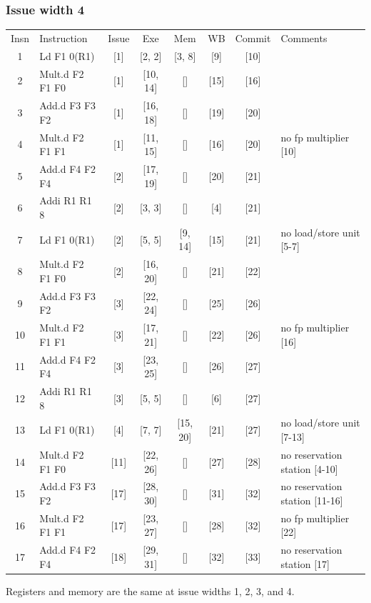 \documentclass[11pt]{article}
\begin{document}
\subsubsection*{Issue width 4}
\begin{center}
\scriptsize
\setlength{\tabcolsep}{8pt}
\renewcommand{\arraystretch}{1.35}
\begin{tabular}{clccccc>{\raggedright\arraybackslash}p{1.4in}}
Insn & Instruction & Issue & Exe & Mem & WB & Commit & Comments \\
1 & Ld F1 0(R1) & [1] & [2, 2] & [3, 8] & [9] & [10] &  \\
2 & Mult.d F2 F1 F0 & [1] & [10, 14] & [] & [15] & [16] &  \\
3 & Add.d F3 F3 F2 & [1] & [16, 18] & [] & [19] & [20] &  \\
4 & Mult.d F2 F1 F1 & [1] & [11, 15] & [] & [16] & [20] & no fp multiplier [10] \\
5 & Add.d F4 F2 F4 & [2] & [17, 19] & [] & [20] & [21] &  \\
6 & Addi R1 R1 8 & [2] & [3, 3] & [] & [4] & [21] &  \\
7 & Ld F1 0(R1) & [2] & [5, 5] & [9, 14] & [15] & [21] & no load/store unit [5-7] \\
8 & Mult.d F2 F1 F0 & [2] & [16, 20] & [] & [21] & [22] &  \\
9 & Add.d F3 F3 F2 & [3] & [22, 24] & [] & [25] & [26] &  \\
10 & Mult.d F2 F1 F1 & [3] & [17, 21] & [] & [22] & [26] & no fp multiplier [16] \\
11 & Add.d F4 F2 F4 & [3] & [23, 25] & [] & [26] & [27] &  \\
12 & Addi R1 R1 8 & [3] & [5, 5] & [] & [6] & [27] &  \\
13 & Ld F1 0(R1) & [4] & [7, 7] & [15, 20] & [21] & [27] & no load/store unit [7-13] \\
14 & Mult.d F2 F1 F0 & [11] & [22, 26] & [] & [27] & [28] & no reservation station [4-10] \\
15 & Add.d F3 F3 F2 & [17] & [28, 30] & [] & [31] & [32] & no reservation station [11-16] \\
16 & Mult.d F2 F1 F1 & [17] & [23, 27] & [] & [28] & [32] & no fp multiplier [22] \\
17 & Add.d F4 F2 F4 & [18] & [29, 31] & [] & [32] & [33] & no reservation station [17] \\
\end{tabular}
\end{center}
Registers and memory are the same at issue widths 1, 2, 3, and 4.
\end{document}
